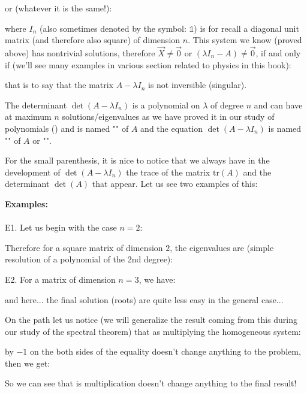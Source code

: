 	or (whatever it is the same!):
	
	where $I_n$ (also sometimes denoted by the symbol: $\mathds{1}$) is for recall a diagonal unit matrix (and therefore also square) of dimension $n$. This system we know (proved above) has nontrivial solutions, therefore $\vec{X} \neq\vec{0}$ or $(\lambda I_n-A)\neq \vec{0}$, if and only if (we'll see many examples in various section related to physics in this book):
	
	that is to say that the matrix $A-\lambda I_n$ is not inversible (singular).
	
	The determinant $\det(A-\lambda I_n)$ is a polynomial on $\lambda$ of degree $n$ and can have at maximum $n$ solutions/eigenvalues as we have proved it in our study of polynomials () and is named "\label{characteristic polynomial determinant}" of $A$ and the equation $\det(A-\lambda I_n)$ is named "" of $A$ or "\label{eigenvalue equations}".
	
	For the small parenthesis, it is nice to notice that we always have in the development of $\det(A-\lambda I_n)$ the trace of the matrix $\text{tr}(A)$ and the determinant $\det (A)$ that appear. Let us see two examples of this:
	
	\begin{tcolorbox}[colframe=black,colback=white,sharp corners]
	\textbf{{\Large {}}Examples:}\\\\
	E1. Let us begin with the case $n=2$:
	
	Therefore for a square matrix of dimension $2$, the eigenvalues are (simple resolution of a polynomial of the 2nd degree):
	
	E2. For a matrix of dimension $n=3$, we have:
	
	and here... the final solution (roots) are quite less easy in the general case...
	\end{tcolorbox}
	On the path let us notice (we will generalize the result coming from this during our study of the spectral theorem) that as multiplying the homogeneous system:
	
	by $-1$ on the both sides of the equality doesn't change anything to the problem, then we get:
	
	So we can see that is multiplication doesn't change anything to the final result!
	
